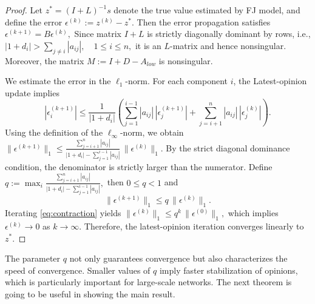 \documentclass[sigconf,review, nonacm]{acmart}
\newcommand\s{\boldsymbol{\mathit{s}}}
\newcommand\zz{\boldsymbol{\mathit{z}}}
\renewcommand\AA{\boldsymbol{\mathit{A}}}
\newcommand\BB{\boldsymbol{\mathit{B}}}
\newcommand\DD{\boldsymbol{\mathit{D}}}
\newcommand\II{\boldsymbol{\mathit{I}}}
\newcommand\LL{\boldsymbol{\mathit{L}}}
\newcommand\MM{\boldsymbol{\mathit{M}}}
\begin{document}
\begin{proof}
	Let $\zz^\ast=(\II+\LL)^{-1}\s$ denote the true value estimated by FJ model, and define the error $\epsilon^{(k)} := \zz^{(k)} - \zz^\ast$.
	Then the error propagation satisfies
	$		\label{eq:error-prop}
	\epsilon^{(k+1)} = \BB \epsilon^{(k)},$
	Since matrix $\II+\LL$ is strictly diagonally dominant by rows, i.e.,	$|1+d_{i}| > \sum_{j \neq i} |a_{ij}|, \quad 1\leq i \leq n,$ it is an $L$-matrix and hence nonsingular.
	Moreover, the matrix $\MM := \II+\DD-\AA_{low}$ is nonsingular.
	
	We estimate the error in the $\ell_1$-norm.
	For each component $i$, the Latest-opinion update implies
	\begin{equation}
		\label{eq:gs-component}
		|\epsilon_i^{(k+1)}|
		\le
		\frac{1}{|1+d_{i}|}
		\left(
		\sum_{j=1}^{i-1} |a_{ij}| \, |\epsilon_j^{(k+1)}|
		+
		\sum_{j=i+1}^{n} |a_{ij}| \, |\epsilon_j^{(k)}|
		\right).
	\end{equation}
	Using the definition of the $\ell_\infty$-norm, we obtain
	$		\|\epsilon^{(k+1)}\|_1
	\le
	\frac{\sum_{j=i+1}^{n} |a_{ij}|}{|1+d_{i}| - \sum_{j=1}^{i-1} |a_{ij}|}
	\,
	\|\epsilon^{(k)}\|_1.$
	By the strict diagonal dominance condition, the denominator is strictly larger than the numerator.
	Define
		$q := \max_i
		\frac{\sum_{j=i+1}^{n} |a_{ij}|}{|1+d_{i}| - \sum_{j=1}^{i-1} |a_{ij}|},$
	then $0 \le q < 1$ and
	\begin{equation}
		\label{eq:contraction}
		\|\epsilon^{(k+1)}\|_1 \le q \, \|\epsilon^{(k)}\|_1.
	\end{equation}
	Iterating \eqref{eq:contraction} yields
	$\|\epsilon^{(k)}\|_1 \le q^k \, \|\epsilon^{(0)}\|_1,$
	which implies $\epsilon^{(k)} \to 0$ as $k \to \infty$.
	Therefore, the latest-opinion iteration converges linearly to $\zz^\ast$.
\end{proof}

The parameter $q$ not only guarantees convergence but also characterizes the speed of convergence.
Smaller values of $q$ imply faster stabilization of opinions, which is particularly important for large-scale networks.
The next theorem is going to be useful in showing the main result.
\end{document}
